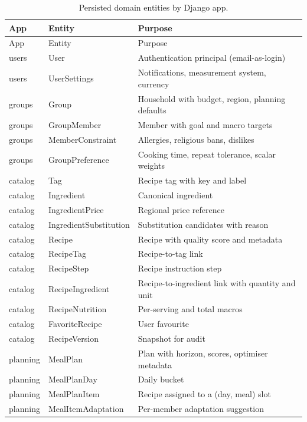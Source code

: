 \begin{longtable}{|l|l|p{8cm}|}
\caption{Persisted domain entities by Django app.}
\label{tab:entities-full}\\
\hline
App & Entity & Purpose \\
\hline
\endfirsthead
\hline
App & Entity & Purpose \\
\hline
\endhead
users    & User                  & Authentication principal (email-as-login) \\
users    & UserSettings          & Notifications, measurement system, currency \\
groups   & Group                 & Household with budget, region, planning defaults \\
groups   & GroupMember           & Member with goal and macro targets \\
groups   & MemberConstraint      & Allergies, religious bans, dislikes \\
groups   & GroupPreference       & Cooking time, repeat tolerance, scalar weights \\
catalog  & Tag                   & Recipe tag with key and label \\
catalog  & Ingredient            & Canonical ingredient \\
catalog  & IngredientPrice       & Regional price reference \\
catalog  & IngredientSubstitution& Substitution candidates with reason \\
catalog  & Recipe                & Recipe with quality score and metadata \\
catalog  & RecipeTag             & Recipe-to-tag link \\
catalog  & RecipeStep            & Recipe instruction step \\
catalog  & RecipeIngredient      & Recipe-to-ingredient link with quantity and unit \\
catalog  & RecipeNutrition       & Per-serving and total macros \\
catalog  & FavoriteRecipe        & User favourite \\
catalog  & RecipeVersion         & Snapshot for audit \\
planning & MealPlan              & Plan with horizon, scores, optimiser metadata \\
planning & MealPlanDay           & Daily bucket \\
planning & MealPlanItem          & Recipe assigned to a (day, meal) slot \\
planning & MealItemAdaptation    & Per-member adaptation suggestion \\

\end{longtable}
